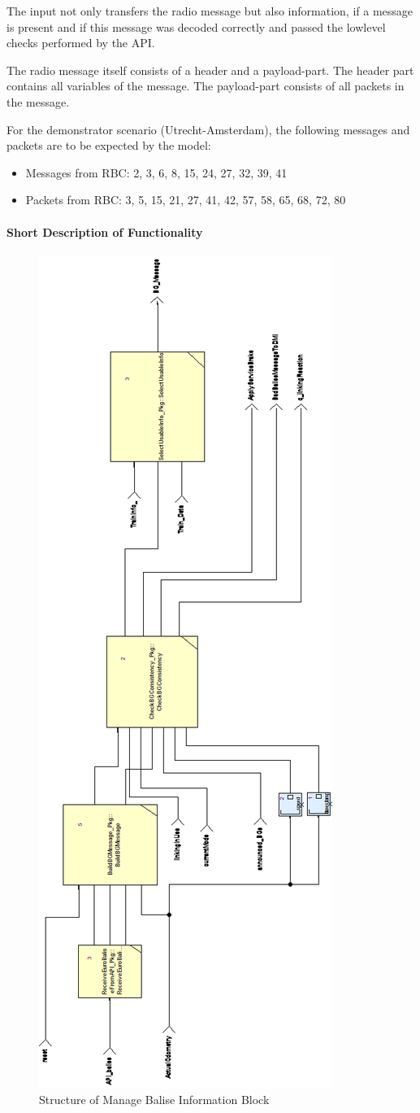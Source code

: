 \documentclass{template/openetcs_report}
\begin{document}
The input not only transfers the radio message but also information, if a message is present and if this message was decoded correctly and passed the lowlevel checks performed by the API.

The radio message itself consists of a header and a payload-part. The header part contains all variables of the message. The payload-part consists of all packets in the message.

For the demonstrator scenario (Utrecht-Amsterdam), the following messages and packets are to be expected by the model:
 \begin{itemize}
  \item Messages from RBC: 2, 3, 6, 8, 15, 24, 27, 32, 39, 41
  \item Packets from RBC: 3, 5, 15, 21, 27, 41, 42, 57, 58, 65, 68, 72, 80
 \end{itemize}


\paragraph{Short Description of Functionality}

\begin{figure}[hbtp]
\centering
\includegraphics[width=.5\textwidth]{../images/ManageBaliseInformation.png}
\caption{Structure of Manage Balise Information Block}
\end{figure}
\end{document}
